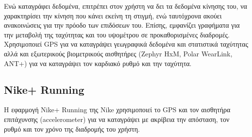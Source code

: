 \documentclass[12pt,twoside,openright]{report}
\begin{document}
Ενώ καταγράφει δεδομένα, επιτρέπει στον χρήστη να δει τα δεδομένα κίνησης του, να χαρακτηρίσει την κίνηση που κάνει εκείνη τη στιγμή, ενώ ταυτόχρονα ακούει ανακοινώσεις για την πρόοδο των επιδόσεων του. Επίσης, εμφανίζει γραφήματα για την μεταβολή της ταχύτητας και του υψομέτρου σε προκαθορισμένες διαδρομές. Χρησιμοποιεί \lt GPS \gt για να καταγράψει γεωγραφικά δεδομένα και στατιστικά ταχύτητας αλλά και εξωτερικούς βιομετρικούς αισθητήρες \lt (Zephyr HxM, Polar WearLink, ANT+) \gt για να καταγράψει τον καρδιακό ρυθμό και την ταχύτητα. 

\subsection*{\lt Nike+ Running\gt }
Η εφαρμογή \lt Nike+ Running  \gt της \lt Nike  \gt χρησιμοποιεί το \lt GPS \gt και τον αισθητήρα επιτάχυνσης \lt (accelerometer) \gt για να καταγράψει με ακρίβεια την απόσταση, τον ρυθμό και τον χρόνο της διαδρομής του χρήστη. 
\end{document}
